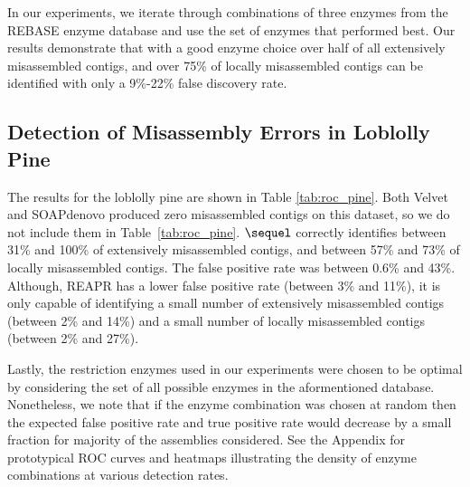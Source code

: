 \documentclass[doctor]{thesis}
\begin{document}
In our experiments, we iterate through combinations of three enzymes from the REBASE enzyme database \cite{roberts2010rebase} and use the set of enzymes that performed best.  
Our results demonstrate that with a good enzyme choice over half of all extensively misassembled contigs, and over 75\% of locally misassembled contigs can be identified with only a 9\%-22\% false discovery rate.
 
\subsection{Detection of Misassembly Errors in Loblolly Pine}\label{sec:pine}

The results for the loblolly pine are shown in Table \ref{tab:roc_pine}.  Both Velvet and SOAPdenovo produced zero misassembled contigs on this dataset, so we do not include them in Table~\ref{tab:roc_pine}.
$\sequel$ correctly identifies between 31\% and 100\% of extensively misassembled contigs, and between 57\% and 73\% of locally misassembled contigs.  The false positive rate was between 0.6\% and 43\%.  Although, REAPR has a lower false positive rate (between 3\% and 11\%), it is only capable of identifying a small number of extensively misassembled contigs (between 2\% and 14\%) and a small number of locally misassembled contigs (between 2\% and 27\%).  

Lastly, the restriction enzymes used in our experiments were chosen to be optimal by considering the set of all possible enzymes in the aformentioned database.  
Nonetheless, we note that if the enzyme combination was chosen at random then the expected false positive rate and true positive rate would decrease by a small fraction for majority of the assemblies considered.  
See the Appendix for prototypical ROC curves and heatmaps illustrating the density of enzyme combinations at various detection rates.
\end{document}
